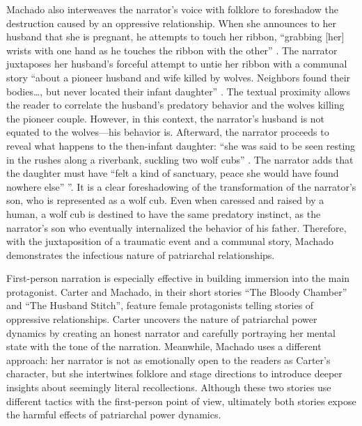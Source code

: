 \documentclass{mla}
\begin{document}
Machado also interweaves the narrator's voice with folklore to foreshadow the destruction caused by an oppressive relationship.
When she announces to her husband that she is pregnant, he attempts to touch her ribbon, ``grabbing [her] wrists with one hand as he touches the ribbon with the other'' \autocite[][12]{machado}.
The narrator juxtaposes her husband's forceful attempt to untie her ribbon with a communal story ``about a pioneer husband and wife killed by wolves. Neighbors found their bodies\ldots, but never located their infant daughter'' \autocite[][13]{machado}.
The textual proximity allows the reader to correlate the husband's predatory behavior and the wolves killing the pioneer couple.
However, in this context, the narrator's husband is not equated to the wolves---his behavior is.
Afterward, the narrator proceeds to reveal what happens to the then-infant daughter: ``she was said to be seen resting in the rushes along a riverbank, suckling two wolf cubs'' \autocite[][13]{machado}.
The narrator adds that the daughter must have ``felt a kind of sanctuary, peace she would have found nowhere else'' \autocite[][13]{machado}''.
It is a clear foreshadowing of the transformation of the narrator's son, who is represented as a wolf cub.
Even when caressed and raised by a human, a wolf cub is destined to have the same predatory instinct, as the narrator's son who eventually internalized the behavior of his father.
Therefore, with the juxtaposition of a traumatic event and a communal story, Machado demonstrates the infectious nature of patriarchal relationships.

First-person narration is especially effective in building immersion into the main protagonist.
Carter and Machado, in their short stories ``The Bloody Chamber'' and ``The Husband Stitch'', feature female protagonists telling stories of oppressive relationships.
Carter uncovers the nature of patriarchal power dynamics by creating an honest narrator and carefully portraying her mental state with the tone of the narration.
Meanwhile, Machado uses a different approach: her narrator is not as emotionally open to the readers as Carter's character, but she intertwines folklore and stage directions to introduce deeper insights about seemingly literal recollections.
Although these two stories use different tactics with the first-person point of view, ultimately both stories expose the harmful effects of patriarchal power dynamics.
\end{document}
